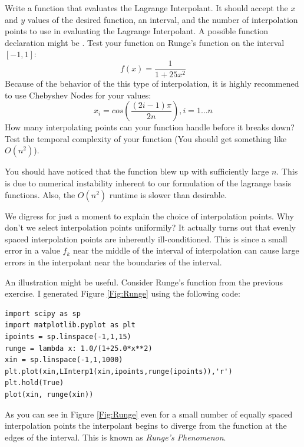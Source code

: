 \begin{problem}
Write a function that evaluates the Lagrange Interpolant.  It should accept the $x$ and $y$ values of the desired function, an interval, and the number of interpolation points to use in evaluating the Lagrange Interpolant.  A possible function declaration might be . Test your function on Runge's function on the interval $[-1,1]$:
\[
f(x) = \frac{1}{1+25x^2}
\]
Because of the behavior of the this type of interpolation, it is highly recommened to use Chebyshev Nodes for your  values:
\[
x_i = cos\left(\frac{(2i-1)\pi}{2n}\right), i = 1\ldots n
\]
How many interpolating points can your function handle before it breaks down? Test the temporal complexity of your function (You should get something like $O(n^2)$).
\end{problem}

You should have noticed that the function blew up with sufficiently large $n$. This is due to numerical instability inherent to our formulation of the lagrange basis functions. Also, the $O(n^2)$ runtime is slower than desirable.

We digress for just a moment to explain the choice of interpolation points. Why don't we select interpolation points uniformily? It actually turns out that evenly spaced interpolation points are inherently ill-conditioned. This is since a small error in a value $f_k$ near the middle of the interval of interpolation can cause large errors in the interpolant near the boundaries of the interval.

An illustration might be useful. Consider Runge's function from the previous exercise. I generated Figure \ref{Fig:Runge} using the following code:

\begin{lstlisting}[style=python]
import scipy as sp
import matplotlib.pyplot as plt
ipoints = sp.linspace(-1,1,15)
runge = lambda x: 1.0/(1+25.0*x**2)
xin = sp.linspace(-1,1,1000)
plt.plot(xin,LInterp1(xin,ipoints,runge(ipoints)),'r')
plt.hold(True)
plot(xin, runge(xin))
\end{lstlisting}

As you can see in Figure \ref{Fig:Runge} even for a small number of equally spaced interpolation points the interpolant begins to diverge from the function at the edges of the interval. This is known as \emph{Runge's Phenomenon}.

